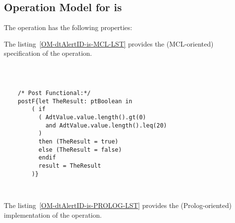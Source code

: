 \subsection{Operation Model for is}

\label{OM-is}


The  operation has the following properties:

	\begin{operationmodel}



		


	\end{operationmodel}



	\vspace{1cm}
	The listing~\ref{OM-dtAlertID-is-MCL-LST} provides the \msrmessir (MCL-oriented) specification of the operation.
	
	\scriptsize
	\vspace{0.5cm}
	\begin{lstlisting}[style=MessirStyle,firstnumber=auto,captionpos=b,caption={\msrmessir (MCL-oriented) specification of the operation \emph{is}.},label=OM-dtAlertID-is-MCL-LST]

	
	
	/* Post Functional:*/ 
	postF{let TheResult: ptBoolean in
	    ( if
	      ( AdtValue.value.length().gt(0)
	        and AdtValue.value.length().leq(20)
	      )
	      then (TheResult = true)
	      else (TheResult = false)
	      endif
	      result = TheResult
	    )}
	
	
	\end{lstlisting}
	\normalsize 
	
	
	
	
	
	\vspace{1cm}
	The listing~\ref{OM-dtAlertID-is-PROLOG-LST} provides the \msrmessir (Prolog-oriented) implementation of the operation.
	
	\scriptsize
	\vspace{0.5cm}
	
	
	\normalsize





